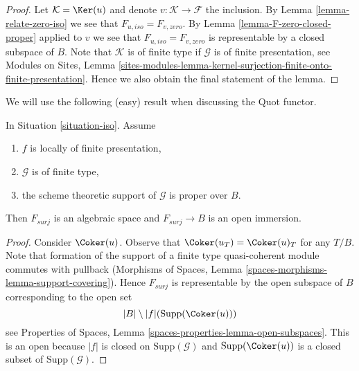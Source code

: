 \begin{proof}
Let $\mathcal{K} = \Ker(u)$ and denote $v : \mathcal{K} \to \mathcal{F}$
the inclusion. By Lemma \ref{lemma-relate-zero-iso} we see that
$F_{u, iso} = F_{v, zero}$. By Lemma \ref{lemma-F-zero-closed-proper}
applied to $v$ we see that $F_{u, iso} = F_{v, zero}$ is representable
by a closed subspace of $B$. Note that $\mathcal{K}$ is of finite type
if $\mathcal{G}$ is of finite presentation, see
Modules on Sites, Lemma
\ref{sites-modules-lemma-kernel-surjection-finite-onto-finite-presentation}.
Hence we also obtain the final statement of the lemma.
\end{proof}

\noindent
We will use the following (easy) result when discussing the Quot functor.

\begin{lemma}
\label{lemma-F-surj-open}
In Situation \ref{situation-iso}. Assume
\begin{enumerate}
\item $f$ is locally of finite presentation,
\item $\mathcal{G}$ is of finite type,
\item the scheme theoretic support of $\mathcal{G}$ is proper over $B$.
\end{enumerate}
Then $F_{surj}$ is an algebraic space and $F_{surj} \to B$
is an open immersion.
\end{lemma}

\begin{proof}
Consider $\Coker(u)$. Observe that
$\Coker(u_T) = \Coker(u)_T$ for any $T/B$.
Note that formation of the support of a finite type
quasi-coherent module commutes with pullback
(Morphisms of Spaces, Lemma \ref{spaces-morphisms-lemma-support-covering}).
Hence $F_{surj}$ is representable by the open subspace of $B$
corresponding to the open set
$$
|B| \setminus |f|(\text{Supp}(\Coker(u)))
$$
see Properties of Spaces, Lemma \ref{spaces-properties-lemma-open-subspaces}.
This is an open because $|f|$ is closed on $\text{Supp}(\mathcal{G})$
and $\text{Supp}(\Coker(u))$ is a closed subset of
$\text{Supp}(\mathcal{G})$.
\end{proof}


















